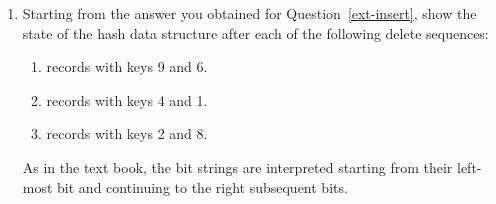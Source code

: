 \documentclass{article}
\begin{document}
\begin{enumerate}[resume]
\begin{enumerate}
\item \label{ext-two} Starting from the answer you obtained for
  Question~\ref{ext-insert}, show the state of the hash data structure
  after each of the following delete sequences:

\begin{enumerate}
\item records with keys 9 and 6.
\item records with keys 4 and 1.
\item records with keys 2 and 8.
\end{enumerate}

As in the text book, the bit strings are interpreted starting from their left-most bit and continuing to the right subsequent bits. 

\end{enumerate}
\end{enumerate}
\end{document}
